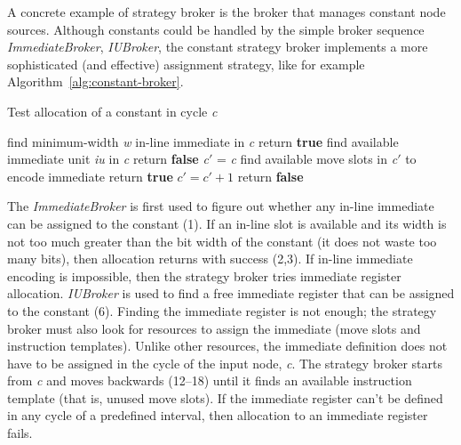 \documentclass[a4paper,twoside]{tce}
\begin{document}
A concrete example of strategy broker is the broker that manages constant
node sources. Although constants could be handled by the simple broker
sequence \emph{ImmediateBroker}, \emph{IUBroker}, the constant strategy
broker implements a more sophisticated (and effective) assignment strategy,
like for example Algorithm~\ref{alg:constant-broker}.

\begin{algorithm}[tb]
  \caption{Test allocation of a constant in cycle \emph{c}}
  \label{alg:constant-broker}
  \renewcommand{\algorithmiccomment}[1]{\hspace{4ex}// #1}
\begin{algorithmic}[1]
  \STATE find minimum-width \emph{w} in-line immediate in \emph{c}
      \STATE return \textbf{true}
  \ELSE
     \STATE\hspace{-4ex}
     \STATE find available immediate unit \emph{iu} in \emph{c}
       \STATE return \textbf{false} 
     \ELSE
       \STATE\hspace{-4ex}
       \STATE \emph{c}$'$ = \emph{c} 
          \STATE find available move slots in \emph{c}$'$ to encode immediate
             \STATE return \textbf{true} 
          \ENDIF
          \STATE $c' = c' +1$
       \ENDWHILE
       \STATE\hspace{-4ex}
       \STATE return \textbf{false} 
     \ENDIF
  \ENDIF
\end{algorithmic}
\end{algorithm}
%
The \emph{ImmediateBroker} is first used to figure out whether any in-line
immediate can be assigned to the constant (1). If an in-line slot is
available and its width is not too much greater than the bit width of the
constant (it does not waste too many bits), then allocation returns with
success (2,3). If in-line immediate encoding is impossible, then the
strategy broker tries immediate register allocation. \emph{IUBroker} is used
to find a free immediate register that can be assigned to the constant (6).
Finding the immediate register is not enough; the strategy broker must also
look for resources to assign the immediate (move slots and instruction
templates). Unlike other resources, the immediate definition does not have
to be assigned in the cycle of the input node, \emph{c}. The strategy broker
starts from \emph{c} and moves backwards (12--18) until it finds an
available instruction template (that is, unused move slots). If the
immediate register can't be defined in any cycle of a predefined interval,
then allocation to an immediate register fails.
\end{document}
